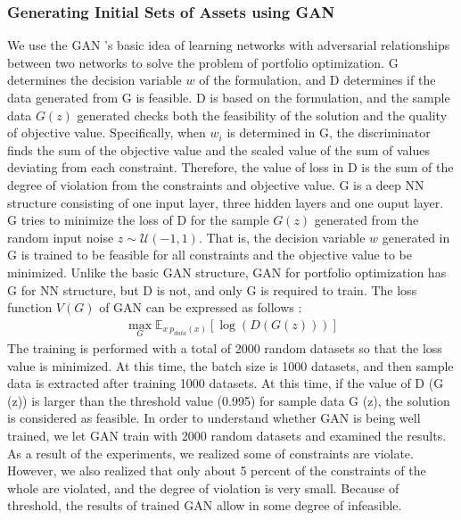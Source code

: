 \documentclass[11pt]{article}
\begin{document}
	\subsubsection{Generating Initial Sets of Assets using GAN}
	
	We use the GAN 's basic idea of learning networks with adversarial relationships between two networks to solve the problem of portfolio optimization. G determines the decision variable $w$ of the formulation, and D determines if the data generated from G is feasible. D is based on the formulation, and the sample data $G(z)$ generated checks both the feasibility of the solution and the quality of objective value. Specifically, when $ w_i $ is determined in G, the discriminator finds the sum of the objective value and the scaled value of the sum of values deviating from each constraint. Therefore, the value of loss in D is the sum of the degree of violation from the constraints and objective value. G is a deep NN structure consisting of one input layer, three hidden layers and one ouput layer. G tries to minimize the loss of D for the sample $G(z)$ generated from the random input noise $z \sim \mathcal {U}(-1,1)$. That is, the decision variable $ w $ generated in G is trained to be feasible for all constraints and the objective value to be minimized. Unlike the basic GAN structure, GAN for portfolio optimization has G for NN structure, but D is not, and only G is required to train. The loss function $V(G)$ of GAN can be expressed as follows :
	\begin{align*}
	\max_G \mathbb{E}_{x~p_{data}(x)}[\log(D(G(z)))] 
	\end{align*}
	The training is performed with a total of 2000 random datasets so that the loss value is minimized. At this time, the batch size is 1000 datasets, and then sample data is extracted after training 1000 datasets. At this time, if the value of D (G (z)) is larger than the threshold value (0.995) for sample data G (z), the solution is considered as feasible. 
	In order to understand whether GAN is being well trained, we let GAN train with 2000 random datasets and examined the results. As a result of the experiments, we realized some of constraints are violate. However, we also realized that only about 5 percent of the constraints of the whole are violated, and the degree of violation is very small. Because of threshold, the results of trained GAN allow in some degree of infeasible. 
	
\end{document}
